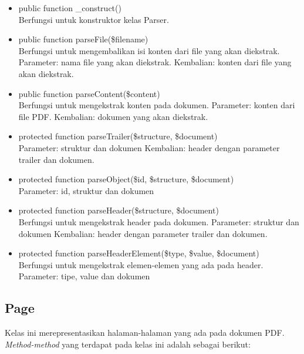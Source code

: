 \begin{itemize}
	\item public function \_construct() \\
	Berfungsi untuk konstruktor kelas Parser.
	
	\item public function parseFile(\$filename) \\
	Berfungsi untuk mengembalikan isi konten dari file yang akan diekstrak. \newline
	Parameter: nama file yang akan diekstrak. \newline
	Kembalian: konten dari file yang akan diekstrak.
	
	\item public function parseContent(\$content) \\
	Berfungsi untuk mengekstrak konten pada dokumen. \newline
	Parameter: konten dari file PDF. \newline
	Kembalian: dokumen yang akan diekstrak.
	
	\item protected function parseTrailer(\$structure, \$document) \\
	Parameter: struktur dan dokumen \newline
	Kembalian: header dengan parameter trailer dan dokumen.
	
	\item protected function parseObject(\$id, \$structure, \$document) \\
	Parameter: id, struktur dan dokumen
	
	\item protected function parseHeader(\$structure, \$document) \\
	Berfungsi untuk mengekstrak header pada dokumen. \newline
	Parameter: struktur dan dokumen \newline	
	Kembalian: header dengan parameter trailer dan dokumen.
	
	\item protected function parseHeaderElement(\$type, \$value, \$document) \\
	Berfungsi untuk mengekstrak elemen-elemen yang ada pada header. \newline
	Parameter: tipe, value dan dokumen
\end{itemize}

\subsection{Page}
Kelas ini merepresentasikan halaman-halaman yang ada pada dokumen PDF. \textit{Method-method} yang terdapat pada kelas ini adalah sebagai berikut:

